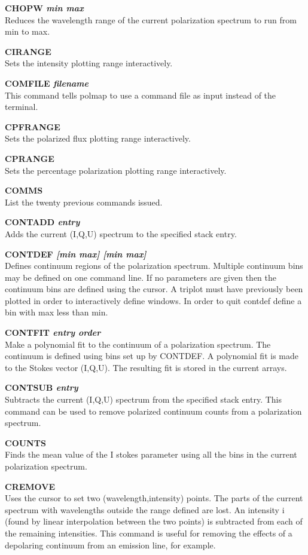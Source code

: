 {\bf CHOPW \it min max} \\
Reduces the wavelength range of the current polarization spectrum to run from
min to  max.

{\bf CIRANGE} \\
Sets the intensity plotting range interactively.

{\bf COMFILE \it filename} \\
This command tells  polmap to use a command file as input instead of the
terminal.

{\bf CPFRANGE} \\
Sets the polarized flux plotting range interactively.

{\bf CPRANGE} \\
Sets the percentage polarization plotting range interactively.

{\bf COMMS} \\
List the twenty previous commands issued.

{\bf CONTADD \it entry} \\
Adds the current (I,Q,U) spectrum to the specified stack entry.

{\bf CONTDEF \it  [min max] [min max] } \\
Defines continuum regions of the polarization spectrum. Multiple continuum bins
may be defined on one command line. If no parameters are given then the
continuum bins are defined using the cursor. A triplot must have previously
been plotted in order to interactively define windows. In order to quit contdef
define a bin with  max less than  min.

{\bf CONTFIT \it entry order } \\
Make a polynomial fit to the continuum of a polarization spectrum. The
continuum is defined using bins set up by  CONTDEF. A polynomial fit is
made to the Stokes vector (I,Q,U). The resulting fit is stored in the
current arrays.

{\bf CONTSUB \it entry  } \\
Subtracts the current (I,Q,U) spectrum from the specified stack entry. This
command can be used to remove polarized continuum counts from a polarization
spectrum.

{\bf COUNTS} \\
Finds the mean value of the I stokes parameter using all the bins in the
current polarization spectrum.

{\bf CREMOVE} \\
Uses the cursor to set two (wavelength,intensity) points. The parts of
the current spectrum with wavelengths outside the range defined are
lost. An intensity i (found by linear interpolation between the two
points) is subtracted from each of the remaining intensities. This
command is useful for removing the effects of a depolaring continuum
from an emission line, for example.


